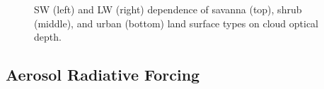 \documentclass[12pt]{article}
\begin{document}
\begin{figure}[h!]
\begin{center}
        \end{center}
        \caption{SW (left) and LW (right) dependence of savanna (top), shrub (middle), and urban (bottom) land surface types on cloud optical depth.}
        \label{ocod2}
    \end{figure}


    \clearpage

    \subsection{Aerosol Radiative Forcing}
\end{document}
